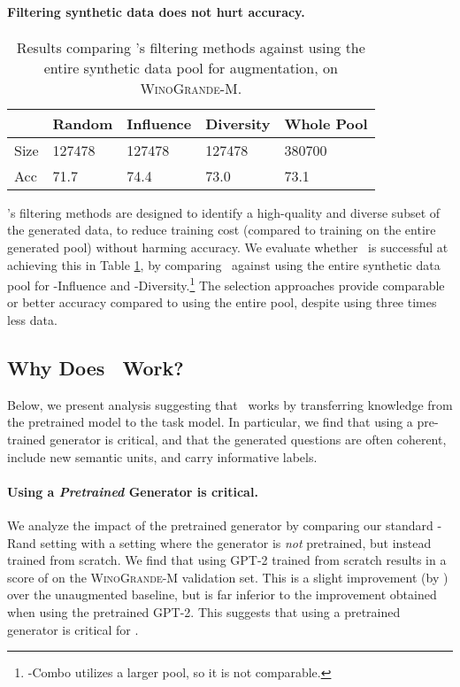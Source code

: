 \documentclass[11pt,a4paper]{article}
\newcommand{\gdaug}{}
\newcommand{\winogrande}{\textsc{WinoGrande}\xspace}
\newcommand{\gpt}{\textsc{GPT-2}\xspace}
\begin{document}
\paragraph{Filtering synthetic data does not hurt accuracy.} 





\begin{table}[hbt!]
\centering
\small
\begin{tabular}{lllll}
                     & Random &Influence &Diversity &Whole Pool \\ \toprule
 Size    &127478   &127478 &127478  &380700  \\ 
Acc &71.7 &74.4 &73.0 &73.1    \\ 
\bottomrule
\end{tabular}
\caption{Results comparing \gdaug's filtering methods against using the entire synthetic data pool for augmentation, on \winogrande-M. 
} \label{pool}
\end{table} \gdaug 's filtering methods are designed to identify a high-quality and diverse subset of the generated data, to reduce training cost (compared to training on the entire generated pool) without harming accuracy.  We evaluate whether \gdaug\ is successful at achieving this in Table \ref{pool}, by comparing \gdaug\ against using the entire synthetic data pool for \gdaug-Influence and \gdaug-Diversity.\footnote{\gdaug-Combo utilizes a larger pool, so it is not comparable.} The selection approaches provide comparable or better accuracy compared to using the entire pool, despite using three times less data.

\subsection{Why Does \gdaug\ Work?}

Below, we present analysis suggesting that \gdaug\ works by transferring knowledge from the pretrained model to the task model.  In particular, we find that using a pre-trained generator is critical, and that the generated questions are often coherent, include new semantic units, and carry informative labels.

\paragraph{Using a {\em Pretrained} Generator is critical.} We analyze the impact of the pretrained generator by comparing our standard \gdaug-Rand setting with a setting where the generator is {\em not} pretrained, but instead trained from scratch. We find that using \gpt trained from scratch results in a score of  on the \winogrande-M validation set. This is a slight improvement (by ) over the unaugmented baseline, but is far inferior to the  improvement obtained when using the pretrained \gpt.
This suggests that using a pretrained generator is critical for \gdaug.
\end{document}
